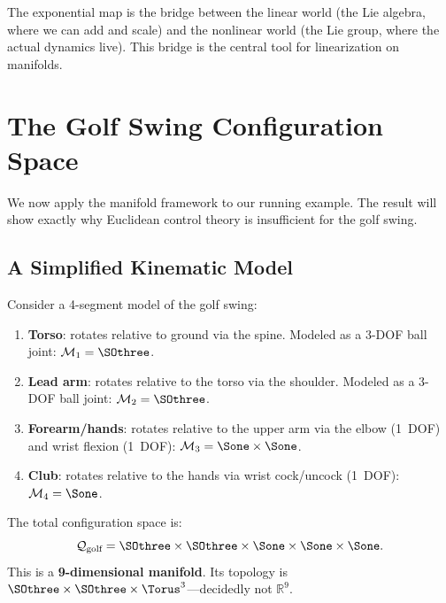 \documentclass[12pt, openany]{book}
\theoremstyle{plain}
\newcommand{\manifold}{\mathcal{M}}
\newcommand{\configspace}{\mathcal{Q}}
\newcommand{\Reals}{\mathbb{R}}
\begin{document}
The exponential map is the bridge between the linear world (the Lie algebra,
where we can add and scale) and the nonlinear world (the Lie group, where
the actual dynamics live). This bridge is the central tool for linearization
on manifolds.

\section{The Golf Swing Configuration Space}

We now apply the manifold framework to our running example. The result will
show exactly why Euclidean control theory is insufficient for the golf swing.

\subsection{A Simplified Kinematic Model}

Consider a 4-segment model of the golf swing:
\begin{enumerate}[label=(\roman*)]
  \item \textbf{Torso}: rotates relative to ground via the spine. Modeled as a
    3-DOF ball joint: $\manifold_1 = \SOthree$.
  \item \textbf{Lead arm}: rotates relative to the torso via the shoulder.
    Modeled as a 3-DOF ball joint: $\manifold_2 = \SOthree$.
  \item \textbf{Forearm/hands}: rotates relative to the upper arm via the
    elbow (1~DOF) and wrist flexion (1~DOF): $\manifold_3 = \Sone \times \Sone$.
  \item \textbf{Club}: rotates relative to the hands via wrist
    cock/uncock (1~DOF): $\manifold_4 = \Sone$.
\end{enumerate}

The total configuration space is:
\begin{equation}\label{eq:golf_config}
  \configspace_{\text{golf}} = \SOthree \times \SOthree \times \Sone \times \Sone
  \times \Sone.
\end{equation}
This is a \textbf{9-dimensional manifold}. Its topology is
$\SOthree \times \SOthree \times \Torus^3$---decidedly not $\Reals^9$.
\end{document}

